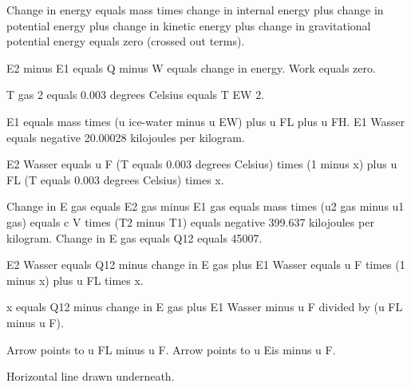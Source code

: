 Change in energy equals mass times change in internal energy plus change in potential energy plus change in kinetic energy plus change in gravitational potential energy equals zero (crossed out terms).  

E2 minus E1 equals Q minus W equals change in energy.  
Work equals zero.  

T gas 2 equals 0.003 degrees Celsius equals T EW 2.  

E1 equals mass times (u ice-water minus u EW) plus u FL plus u FH.  
E1 Wasser equals negative 20.00028 kilojoules per kilogram.  

E2 Wasser equals u F (T equals 0.003 degrees Celsius) times (1 minus x) plus u FL (T equals 0.003 degrees Celsius) times x.  

Change in E gas equals E2 gas minus E1 gas equals mass times (u2 gas minus u1 gas) equals c V times (T2 minus T1) equals negative 399.637 kilojoules per kilogram.  
Change in E gas equals Q12 equals 45007.  

E2 Wasser equals Q12 minus change in E gas plus E1 Wasser equals u F times (1 minus x) plus u FL times x.  

x equals Q12 minus change in E gas plus E1 Wasser minus u F divided by (u FL minus u F).  

Arrow points to u FL minus u F. Arrow points to u Eis minus u F.  

Horizontal line drawn underneath.